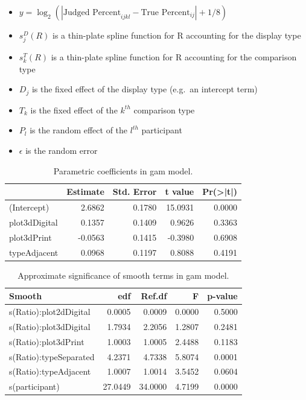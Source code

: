\documentclass[letterpaper,inpress,dvipsnames]{jdsart}
\begin{document}
\begin{itemize}
\item
  \(y=\log_2(|\text{Judged Percent}_{ijkl} - \text{True Percent}_{ij}|+1/8)\)
\item
  \(s^D_j(R)\) is a thin-plate spline function for R accounting for the display type
\item
  \(s^T_k(R)\) is a thin-plate spline function for R accounting for the comparison type
\item
  \(D_j\) is the fixed effect of the display type (e.g.~an intercept term)
\item
  \(T_k\) is the fixed effect of the \(k^{th}\) comparison type
\item
  \(P_l\) is the random effect of the \(l^{th}\) participant
\item
  \(\epsilon\) is the random error
\end{itemize}

\begin{table}

\caption{\label{tab:gam-param}Parametric coefficients in gam model.}
\centering
\begin{tabular}[t]{lrrrr}
\toprule
  & Estimate & Std. Error & t value & Pr(>|t|)\\
\midrule
(Intercept) & 2.6862 & 0.1780 & 15.0931 & 0.0000\\
plot3dDigital & 0.1357 & 0.1409 & 0.9626 & 0.3363\\
plot3dPrint & -0.0563 & 0.1415 & -0.3980 & 0.6908\\
typeAdjacent & 0.0968 & 0.1197 & 0.8088 & 0.4191\\
\bottomrule
\end{tabular}
\end{table}

\begin{table}

\caption{\label{tab:gam-smooth}Approximate significance of smooth terms in gam model.}
\centering
\begin{tabular}[t]{lrrrr}
\toprule
Smooth & edf & Ref.df & F & p-value\\
\midrule
s(Ratio):plot2dDigital & 0.0005 & 0.0009 & 0.0000 & 0.5000\\
s(Ratio):plot3dDigital & 1.7934 & 2.2056 & 1.2807 & 0.2481\\
s(Ratio):plot3dPrint & 1.0003 & 1.0005 & 2.4488 & 0.1183\\
s(Ratio):typeSeparated & 4.2371 & 4.7338 & 5.8074 & 0.0001\\
s(Ratio):typeAdjacent & 1.0007 & 1.0014 & 3.5452 & 0.0604\\
\addlinespace
s(participant) & 27.0449 & 34.0000 & 4.7199 & 0.0000\\
\bottomrule
\end{tabular}
\end{table}
\end{document}
